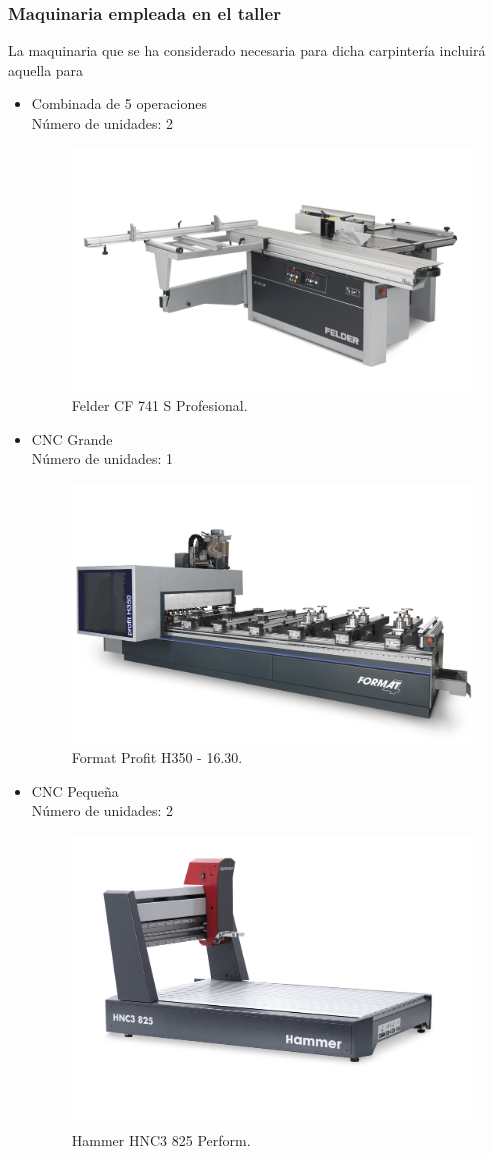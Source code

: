 \documentclass[../main.tex]{subfiles}
\begin{document}
\subsubsection{Maquinaria empleada en el taller}
La maquinaria que se ha considerado necesaria para dicha carpintería incluirá aquella para 
\begin{itemize}
    \item Combinada de 5 operaciones \\
    Número de unidades: 2
    \begin{figure}[H]
        \centering
        \includegraphics[width=0.5\linewidth]{Imagenes/Combinada5Operaciones.png}
        \caption{Felder CF 741 S Profesional.}
    \end{figure}
    
    \item CNC Grande \\
    Número de unidades: 1
    \begin{figure}[H]
        \centering
        \includegraphics[width=0.5\linewidth]{Imagenes/CNCGrande.png}
        \caption{Format Profit H350 - 16.30.}
    \end{figure}

    \item CNC Pequeña \\
    Número de unidades: 2
    \begin{figure}[H]
        \centering
        \includegraphics[width=0.5\linewidth]{Imagenes/CNCPequena.png}
        \caption{Hammer HNC3 825 Perform.}
    \end{figure}


\end{itemize}
\end{document}
